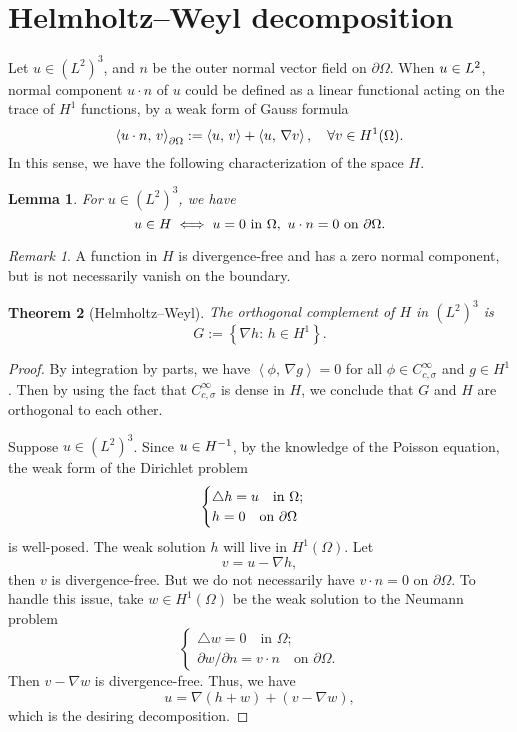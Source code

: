 \documentclass[a4paper, 12pt, oneside]{amsart}
\newtheorem{theorem}{Theorem}
\newtheorem{lemma}[theorem]{Lemma}
\theoremstyle{definition}
\theoremstyle{remark}
\newtheorem*{remark}{Remark}
\let\div\relax\DeclareMathOperator{\div}{div}
\newcommand{\bk}[2]{\left\langle #1,\, #2 \right\rangle}
\newcommand{\set}[1]{\left\{ #1 \right\}}
\renewcommand{\mid}{:\,}
\newcommand{\p}{\partial}
\newcommand{\laplace}{\triangle}
\begin{document}
\section{Helmholtz--Weyl decomposition}

Let $u\in (L^2)^3$, and $n$ be the outer normal vector field on $\p\Omega$. When $\div u\in L^2$, normal component $u\cdot n$ of $u$ could be defined as a linear functional acting on the trace of  $H^1$ functions, by a weak form of Gauss formula
\[
    \bk{u\cdot n}{v}_{\p\Omega} := \bk{\div u}{v} + \bk{u}{\nabla v},\quad\forall v\in H^1(\Omega).
\]
In this sense, we have the following characterization of the space $H$.

\begin{lemma}
    For $u\in (L^2)^3$, we have
    \[
    u\in H\iff \div u = 0\ \text{in $\Omega$},\ u\cdot n=0\ \text{on $\p\Omega$}.
\]
\end{lemma}

\begin{remark}
    A function in $H$ is divergence-free and has a zero normal component, but is not necessarily vanish on the boundary.
\end{remark}

\begin{theorem}[Helmholtz--Weyl]
    The orthogonal complement of $H$ in $(L^2)^3$ is
    \[
        G:=\set{\nabla h\mid h\in H^1}.
    \]
\end{theorem}

\begin{proof}
    By integration by parts, we have $\bk{\phi}{\nabla g}=0$ for all $\phi\in C_{c, \sigma}^\infty$ and $g\in H^1$. Then by using the fact that $C_{c, \sigma}^\infty$ is dense in $H$, we conclude that $G$ and $H$ are orthogonal to each other.
    
    Suppose $u\in (L^2)^3$. Since $\div u\in H^{-1}$, by the knowledge of the Poisson equation, the weak form of the Dirichlet problem
    \[
        \begin{cases}
            \laplace h = \div u\quad\text{in $\Omega$};\\
            h = 0\quad\text{on $\p\Omega$}
        \end{cases}
    \]
    is well-posed. The weak solution $h$ will live in $H^1(\Omega)$. Let
    \[
        v = u - \nabla h,
    \]
    then $v$ is divergence-free. But we do not necessarily have $v\cdot n=0$ on $\p\Omega$. To handle this issue, take $w\in H^1(\Omega)$ be the weak solution to the Neumann problem 
    \[
        \begin{cases}
            \laplace w = 0\quad\text{in $\Omega$};\\
            \p w/\p n = v\cdot n\quad\text{on $\p\Omega$}.
        \end{cases}
    \]
    Then $v-\nabla w$ is divergence-free. Thus, we have
    \[
        u = \nabla(h+w) + (v-\nabla w),
    \]
    which is the desiring decomposition.
\end{proof}
\end{document}
